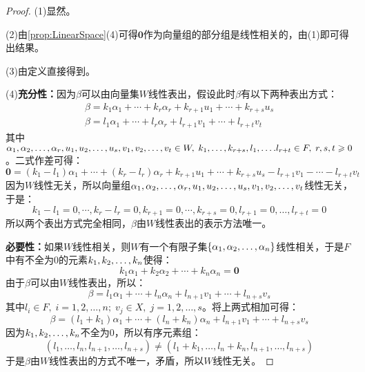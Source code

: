 \begin{proof}
	(1)显然。\par
	(2)由\cref{prop:LinearSpace}(4)可得$\mathbf{0}$作为向量组的部分组是线性相关的，由(1)即可得出结果。\par
	(3)由定义直接得到。\par
	(4)\textbf{充分性：}因为$\beta$可以由向量集$W$线性表出，假设此时$\beta$有以下两种表出方式：
	\begin{gather*}
		\beta=k_1\alpha_1+\cdots+k_r\alpha_r+k_{r+1}u_1+\cdots+k_{r+s}u_s \\
		\beta=l_1\alpha_1+\cdots+l_r\alpha_r+l_{r+1}v_1+\cdots+l_{r+t}v_t
	\end{gather*}
	其中$\alpha_1, \alpha_2, \dots, \alpha_{r},u_1, u_2, \dots, u_{s},v_1, v_2, \dots, v_{t}\in W,\;k_1,\dots,k_{r+s},l_1,\dots.l_{r+t}\in F,\;r,s,t\geqslant0$。二式作差可得：
	\begin{equation*}
		\mathbf{0}=(k_1-l_1)\alpha_1+\cdots+(k_r-l_r)\alpha_r+k_{r+1}u_1+\cdots+k_{r+s}u_s-l_{r+1}v_1-\cdots-l_{r+t}v_t
	\end{equation*}
	因为$W$线性无关，所以向量组$\alpha_1, \alpha_2, \dots, \alpha_{r},u_1, u_2, \dots, u_{s},v_1, v_2, \dots, v_{t}$线性无关，于是：
	\begin{equation*}
		k_1-l_1=0,\cdots,k_r-l_r=0,k_{r+1}=0,\cdots,k_{r+s}=0,l_{r+1}=0,\dots,l_{r+t}=0
	\end{equation*}
	所以两个表出方式完全相同，$\beta$由$W$线性表出的表示方法唯一。\par
	\textbf{必要性：}如果$W$线性相关，则$W$有一个有限子集$\{\alpha_1, \alpha_2, \dots, \alpha_{n}\}$线性相关，于是$F$中有不全为$0$的元素$k_1, k_2, \dots, k_{n}$使得：
	\begin{equation*}
		k_1\alpha_1+k_2\alpha_2+\cdots+k_n\alpha_n=\mathbf{0}
	\end{equation*}
	由于$\beta$可以由$W$线性表出，所以：
	\begin{equation*}
		\beta=l_1\alpha_1+\cdots+l_n\alpha_n+l_{n+1}v_1+\cdots+l_{n+s}v_s
	\end{equation*}
	其中$l_i\in F,\;i=1,2,\dots,n;\;v_j\in X,\;j=1,2,\dots,s$。将上两式相加可得：
	\begin{equation*}
		\beta=(l_1+k_1)\alpha_1+\cdots+(l_n+k_n)\alpha_n+l_{n+1}v_1+\cdots+l_{n+s}v_s
	\end{equation*}
	因为$k_1, k_2, \dots, k_{n}$不全为$0$，所以有序元素组：
	\begin{equation*}
		(l_1,\dots,l_n,l_{n+1},\dots,l_{n+s})\ne(l_1+k_1,\dots,l_n+k_n,l_{n+1},\dots,l_{n+s})
	\end{equation*}
	于是$\beta$由$W$线性表出的方式不唯一，矛盾，所以$W$线性无关。\par

\end{proof}
